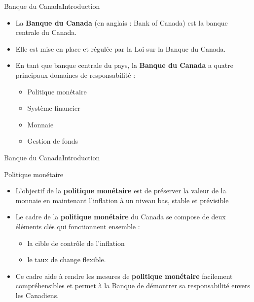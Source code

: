 \documentclass{beamer}
\begin{document}
\begin{frame}{Banque du Canada}{Introduction}
\begin{itemize}
\item La \textbf{Banque du Canada} (en anglais : Bank of Canada) est la banque centrale du Canada. 

\item Elle est mise en place et régulée par la Loi sur la Banque du Canada.

\item En tant que banque centrale du pays, la \textbf{Banque du Canada} a quatre principaux domaines de responsabilité :

\begin{itemize}
\item Politique monétaire
\item Système financier
\item Monnaie
\item Gestion de fonds
\end{itemize}


\end{itemize}


\end{frame}



\begin{frame}{Banque du Canada}{Introduction}
\begin{block}{Politique monétaire}
\begin{itemize}
\item L'objectif de la \textbf{politique monétaire} est de préserver la valeur de la monnaie en maintenant l'inflation à un niveau bas, stable et prévisible
\item Le cadre de la \textbf{politique monétaire} du Canada se compose de deux éléments clés qui fonctionnent ensemble : 
\begin{itemize}
\item la cible de contrôle de l'inflation 
\item le taux de change flexible. 
\end{itemize}

\item Ce cadre aide à rendre les mesures de \textbf{politique monétaire} facilement compréhensibles et permet à la Banque de démontrer sa responsabilité envers les Canadiens.
\end{itemize}
\end{block}



\end{frame}
\end{document}
